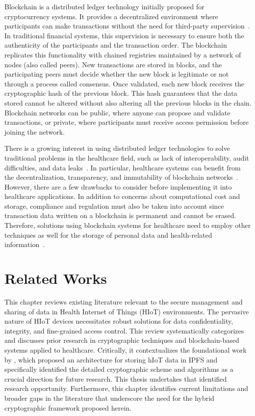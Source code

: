 \documentclass[cic,tc,english]{iiufrgs}
\begin{document}
        Blockchain is a distributed ledger technology initially proposed for cryptocurrency systems. It provides a decentralized environment where participants can make transactions without the need for third-party supervision~\cite{abou2019blockchain}. In traditional financial systems, this supervision is necessary to ensure both the authenticity of the participants and the transaction order. The blockchain replicates this functionality with chained registries maintained by a network of nodes (also called peers). New transactions are stored in blocks, and the participating peers must decide whether the new block is legitimate or not through a process called consensus. Once validated, each new block receives the cryptographic hash of the previous block. This hash guarantees that the data stored cannot be altered without also altering all the previous blocks in the chain. Blockchain networks can be public, where anyone can propose and validate transactions, or private, where participants must receive access permission before joining the network. 
        
        There is a growing interest in using distributed ledger technologies to solve traditional problems in the healthcare field, such as lack of interoperability, audit difficulties, and data leaks~\cite{santos2021towards}. In particular, healthcare systems can benefit from the decentralization, transparency, and immutability of blockchain networks~\cite{Arbabi2023}. However, there are a few drawbacks to consider before implementing it into healthcare applications. In addition to concerns about computational cost and storage, compliance and regulation must also be taken into account since transaction data written on a blockchain is permanent and cannot be erased. Therefore, solutions using blockchain systems for healthcare need to employ other techniques as well for the storage of personal data and health-related information~\cite{minicurso-sbcas}.


\chapter{Related Works}
    \label{chap:relatedworks}

    This chapter reviews existing literature relevant to the secure management and sharing of data in Health Internet of Things (HIoT) environments. The pervasive nature of HIoT devices necessitates robust solutions for data confidentiality, integrity, and fine-grained access control. This review systematically categorizes and discusses prior research in cryptographic techniques and blockchain-based systems applied to healthcare. Critically, it contextualizes the foundational work by \citet{laura2023}, which proposed an architecture for storing hIoT data in IPFS and specifically identified the detailed cryptographic scheme and algorithms as a crucial direction for future research. This thesis undertakes that identified research opportunity. Furthermore, this chapter identifies current limitations and broader gaps in the literature that underscore the need for the hybrid cryptographic framework proposed herein.
\end{document}
